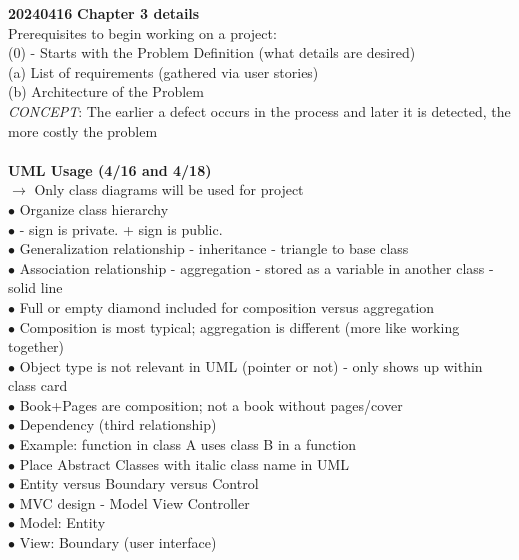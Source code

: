 \documentclass[11pt]{article}
\begin{document}
    \textbf{20240416}
    \textbf{Chapter 3 details}\\
    Prerequisites to begin working on a project:\\
    (0) - Starts with the Problem Definition (what details are desired)\\
    (a) List of requirements (gathered via user stories)\\
    (b) Architecture of the Problem\\
    \textit{CONCEPT}: The earlier a defect occurs in the process and later 
    it is detected, the more costly the problem\\
    \\
    \textbf{UML Usage (4/16 and 4/18)}\\
    $\rightarrow$ Only class diagrams will be used for project\\
    \indent $\bullet$ Organize class hierarchy\\
    \indent $\bullet$ - sign is private. + sign is public.  \\
    \indent $\bullet$ Generalization relationship - inheritance - triangle to base class  \\
    \indent $\bullet$ Association relationship - aggregation - stored as a variable in another class - solid line  \\
    \indent\indent$\bullet$ Full or empty diamond included for composition versus aggregation \\
    \indent\indent$\bullet$ Composition is most typical; aggregation is different (more like working together)\\
    \indent $\bullet$ Object type is not relevant in UML (pointer or not) - only shows up within class card  \\
    \indent $\bullet$ Book+Pages are composition; not a book without pages/cover \\
    \indent $\bullet$ Dependency (third relationship) \\
    \indent\indent $\bullet$ Example: function in class A uses class B in a function \\
    \indent $\bullet$ Place Abstract Classes with italic class name in UML \\
    \indent $\bullet$ Entity versus Boundary versus Control \\
    \indent\indent $\bullet$ MVC design - Model View Controller \\
    \indent\indent $\bullet$ Model: Entity\\
    \indent\indent $\bullet$ View: Boundary (user interface)\\
\end{document}
